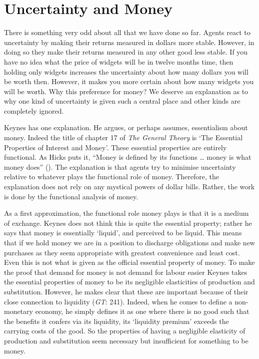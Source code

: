\documentclass[
  11pt,
  letterpaper,
  DIV=11,
  numbers=noendperiod,
  twoside]{scrartcl}
\begin{document}
\section{Uncertainty and Money}\label{uncertainty-and-money}

There is something very odd about all that we have done so far. Agents
react to uncertainty by making their returns measured in dollars more
stable. However, in doing so they make their returns measured in any
other good less stable. If you have no idea what the price of widgets
will be in twelve months time, then holding only widgets increases the
uncertainty about how many dollars you will be worth then. However, it
makes you more certain about how many widgets you will be worth. Why
this preference for money? We deserve an explanation as to why one kind
of uncertainty is given such a central place and other kinds are
completely ignored.

Keynes has one explanation. He argues, or perhaps assumes, essentialism
about money. Indeed the title of chapter 17 of \emph{The General Theory}
is `The Essential Properties of Interest and Money'. These essential
properties are entirely functional. As Hicks puts it, ``Money is defined
by its functions \ldots{} money is what money does''
(). The explanation is that
agents try to minimise uncertainty relative to whatever plays the
functional role of money. Therefore, the explanation does not rely on
any mystical powers of dollar bills. Rather, the work is done by the
functional analysis of money.

As a first approximation, the functional role money plays is that it is
a medium of exchange. Keynes does not think this is quite the essential
property; rather he says that money is essentially `liquid', and
perceived to be liquid. This means that if we hold money we are in a
position to discharge obligations and make new purchases as they seem
appropriate with greatest convenience and least cost. Even this is not
what is given as the official essential property of money. To make the
proof that demand for money is not demand for labour easier Keynes takes
the essential properties of money to be its negligible elasticities of
production and substitution. However, he makes clear that these are
important because of their close connection to liquidity (\emph{GT}:
241). Indeed, when he comes to define a non-monetary economy, he simply
defines it as one where there is no good such that the benefits it
confers via its liquidity, its `liquidity premium' exceeds the carrying
costs of the good. So the properties of having a negligible elasticity
of production and substitution seem necessary but insufficient for
something to be money.
\end{document}
